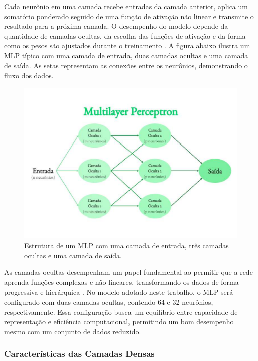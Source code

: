 Cada neurônio em uma camada recebe entradas da camada anterior, aplica um somatório ponderado seguido de uma função de ativação não linear e transmite o resultado para a próxima camada. O desempenho do modelo depende da quantidade de camadas ocultas, da escolha das funções de ativação e da forma como os pesos são ajustados durante o treinamento \cite{haykin2009}. A figura abaixo ilustra um MLP típico com uma camada de entrada, duas camadas ocultas e uma camada de saída.  As setas representam as conexões entre os neurônios, demonstrando o fluxo dos dados.

\begin{figure}[h]
    \captionsetup{font=footnotesize, position=above}
    \label{fig:biopsiaPGT-A}
    \centering
    \includegraphics[scale=0.35]{figuras/multilayer.pdf}
    \caption{Estrutura de um MLP com uma camada de entrada, três camadas ocultas e uma camada de saída.}
    \vspace{0.3cm}
\end{figure}
\FloatBarrier

As camadas ocultas desempenham um papel fundamental ao permitir que a rede aprenda funções complexas e não lineares, transformando os dados de forma progressiva e hierárquica \cite{haykin2009}. No modelo adotado neste trabalho, o MLP será configurado com duas camadas ocultas, contendo 64 e 32 neurônios, respectivamente. Essa configuração busca um equilíbrio entre capacidade de representação e eficiência computacional, permitindo um bom desempenho mesmo com um conjunto de dados reduzido.

\subsubsection{Características das Camadas Densas}

